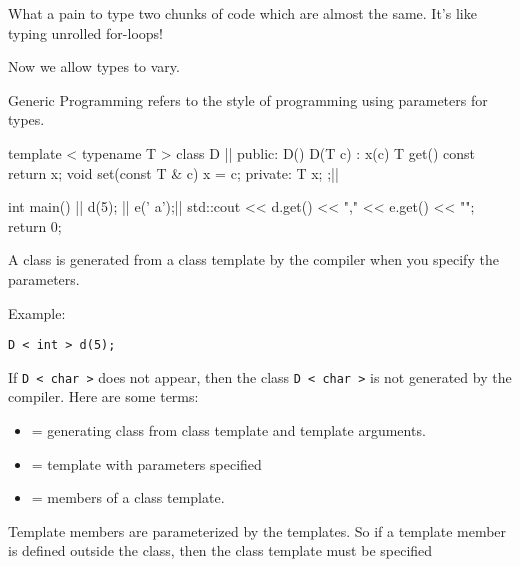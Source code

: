 What a pain to type two chunks of code which are almost the same. It's
like typing unrolled for-loops!

\newpage{}

Now we allow types to vary.

Generic Programming refers to the style of programming using parameters
for types.

\begin{consolethree}[escapeinside=||]
template < typename T >
class D {||
public:
     D(){}
     D(T c) : x(c) {}
     T get() const { return x; }
     void set(const T & c) { x = c; }
private:
     T x;
};||

int main()
{   
    || d(5);
    || e(' a');||
    std::cout << d.get() << ","
              << e.get() << "\n";
    return 0;
} 
\end{consolethree}
A class is generated from a class template by the compiler when you
specify the parameters.

Example:

\verb!D < int > d(5);!

If \texttt{D < char >} does not appear, then the
class \texttt{D < char >} is not generated by the
compiler. Here are some terms:

\begin{itemize}
\item
   = generating class from class template and template arguments.
\item
   = template with parameters specified
\item
   = members of a class template.
\end{itemize}

Template members are parameterized by the templates. So if a template
member is defined outside the class, then the class template must be
specified


